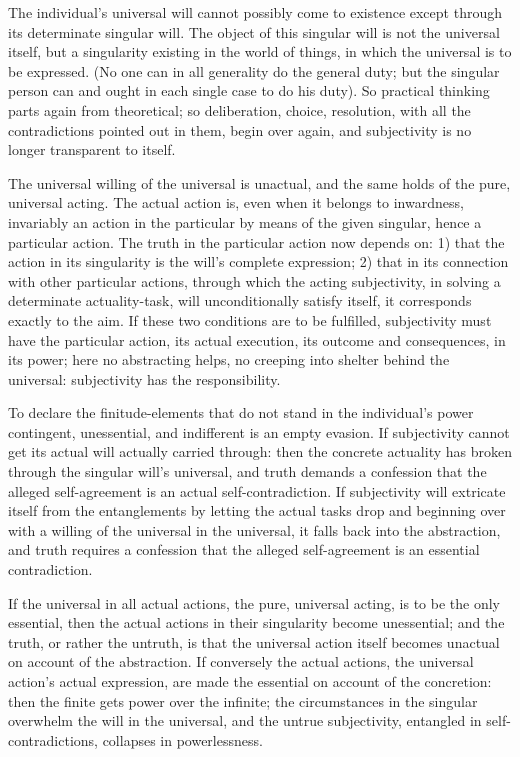 \documentclass[12pt]{book}
\begin{document}
The individual's universal will cannot possibly come to existence
except through its determinate singular will. The object of this
singular will is not the universal itself, but a
singularity existing in the world of things, in which the universal
is to be expressed. (No one can in all generality do the general
duty; but the singular person can and ought in each single case to
do his duty). So practical thinking parts again from theoretical; so
deliberation, choice, resolution, with all the contradictions
pointed out in them, begin over again, and subjectivity is no longer
transparent to itself.

The universal willing of the universal is unactual, and the same
holds of the pure, universal acting. The actual action is, even when
it belongs to inwardness, invariably an action in the particular by
means of the given singular, hence a particular action. The truth in
the particular action now depends on: 1) that the action in its
singularity is the will's complete expression; 2) that in its
connection with other particular actions, through which the acting
subjectivity, in solving a determinate actuality-task, will
unconditionally satisfy itself, it corresponds exactly to the aim.
If these two conditions are to be fulfilled, subjectivity must have
the particular action, its actual execution, its outcome and
consequences, in its power; here no abstracting helps, no creeping
into shelter behind the universal: subjectivity has the
responsibility.

To declare the finitude-elements that do not stand in the
individual's power contingent, unessential, and indifferent is an
empty evasion. If subjectivity cannot get its actual will actually
carried through: then the concrete actuality has broken through the
singular will's universal, and truth demands a confession that the
alleged self-agreement is an actual self-contradiction. If
subjectivity will extricate itself from the entanglements by letting
the actual tasks drop and beginning over with a willing of the
universal in the universal, it falls back into the abstraction, and
truth requires a confession that the alleged self-agreement is an
essential contradiction.

If the universal in all actual actions, the pure, universal acting,
is to be the only essential, then the actual actions in their
singularity become unessential; and the truth, or rather the
untruth, is that the universal action itself becomes unactual on
account of the abstraction. If conversely the actual actions, the
universal action's actual expression, are made the essential on
account of the concretion: then the finite gets power over the
infinite; the circumstances in the singular overwhelm the will in
the universal, and the untrue subjectivity, entangled in
self-contradictions, collapses in powerlessness.
\end{document}
